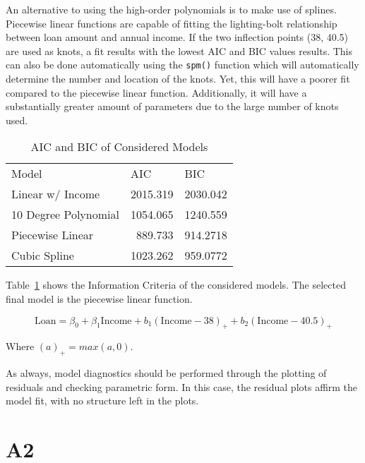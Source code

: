 An alternative to using the high-order polynomials is to make use of splines. Piecewise linear functions are capable of fitting the lighting-bolt relationship between loan amount and annual income. If the two inflection points (38, 40.5) are used as knots, a fit results with the lowest AIC and BIC values results. This can also be done automatically using the \lstinline{spm()} function which will automatically determine the number and location of the knots. Yet, this will have a poorer fit compared to the piecewise linear function. Additionally, it will have a substantially greater amount of parameters due to the large number of knots used. 

\begin{table}[htbp]
  \centering
    \begin{tabular}{lrr}
    Model & \multicolumn{1}{l}{AIC} & \multicolumn{1}{l}{BIC} \\
    Linear w/ Income & 2015.319 & 2030.042 \\
    10 Degree Polynomial & 1054.065 & 1240.559 \\
    Piecewise Linear & 889.733 & 914.2718 \\
    Cubic Spline & 1023.262 & 959.0772 \\
    \end{tabular}%
  \caption{AIC and BIC of Considered Models}
  \label{a1_tab}%
\end{table}%


Table~\ref{a1_tab} shows the Information Criteria of the considered models. The selected final model is the piecewise linear function. 

$$\text{Loan} = \beta_0 + \beta_1\text{Income} + b_1(\text{Income} - 38)_+ + b_2(\text{Income} - 40.5)_+ $$

Where $(a)_+ = max(a, 0)$. 

As always, model diagnostics should be performed through the plotting of residuals and checking parametric form. In this case, the residual plots affirm the model fit, with no structure left in the plots. 


\section{A2}





